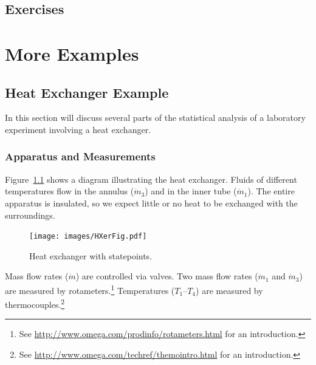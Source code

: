 \documentclass[twoside]{book}\usepackage[]{graphicx}\usepackage[]{xcolor}
\newcommand{\Partial}[2]{\frac{\partial #1}{\partial #2}}
\newif\ifsolutions
\newif\ifsolutionslocal
\begin{document}
\newpage
\section*{Exercises}
\shipoutProblems


\ifsolutions
\newpage
\section*{Solutions}
\shipoutSolutions
\fi




\chapter{More Examples}

\section{Heat Exchanger Example}


In this section will discuss several parts of the statistical
analysis of a laboratory experiment involving a heat exchanger.


\subsection{Apparatus and Measurements}

Figure~\ref{fig:HXer_Figure} shows a diagram illustrating the 
heat exchanger.  Fluids of different temperatures flow in the annulus 
($\dot{m}_{3}$) and in the inner tube ($\dot{m}_{1}$).
The entire apparatus is insulated, 
so we expect little or no heat to be exchanged with the surroundings.

\begin{figure}
    \centering
    \texttt{[image: images/HXerFig.pdf]}
    \caption{Heat exchanger with statepoints.}
    \label{fig:HXer_Figure}
\end{figure}


Mass flow rates ($\dot{m}$) are controlled via valves.
Two mass flow rates ($\dot{m}_{1}$ and $\dot{m}_{3}$)
are measured by rotameters.\footnote{See 
\url{http://www.omega.com/prodinfo/rotameters.html}
for an introduction.}
Temperatures ($T_{1}$--$T_{4}$) are measured by thermocouples.\footnote{See 
\url{http://www.omega.com/techref/themointro.html} for an introduction.}
\end{document}
